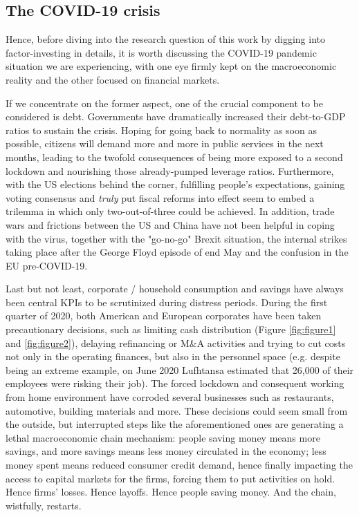 \documentclass[12pt]{article}
\begin{document}
\subsection{The COVID-19 crisis}
Hence, before diving into the research question of this work by digging into factor-investing in details, it is worth discussing the  COVID-19 pandemic situation we are experiencing, with one eye firmly kept on the macroeconomic reality and the other focused on financial markets. 

If we concentrate on the former aspect, one of the crucial component to be considered is debt. Governments have dramatically increased their debt-to-GDP ratios to sustain the crisis. Hoping for going back to normality as soon as possible, citizens will demand more and more in public services in the next months, leading to the twofold consequences of being more exposed to a second lockdown and nourishing those already-pumped leverage ratios. Furthermore, with the US elections behind the corner, fulfilling people's expectations, gaining voting consensus and \textit{truly} put fiscal reforms into effect seem to embed a trilemma in which only two-out-of-three could be achieved. In addition, trade wars and frictions between the US and China have not been helpful in coping with the virus, together with the "go-no-go" Brexit situation, the  internal strikes taking place after the George Floyd episode of end May and the confusion in the EU pre-COVID-19. 

Last but not least, corporate / household consumption and savings have always been central KPIs to be scrutinized during distress periods. During the first quarter of 2020, both American and European corporates have been taken precautionary decisions, such as limiting cash distribution (Figure \ref{fig:figure1} and \ref{fig:figure2}), delaying refinancing or M\&A activities and trying to cut costs not only in the operating finances, but also in the personnel space (e.g. despite being an extreme example, on June 2020 Lufhtansa estimated that 26,000 of their employees were risking their job). The forced lockdown and consequent working from home environment have corroded several businesses such as restaurants, automotive, building materials and more. These decisions could seem small from the outside, but interrupted steps like the aforementioned ones are generating a lethal macroeconomic chain mechanism: people saving money means more savings, and more savings means less money circulated in the economy; less money spent means reduced consumer credit demand, hence finally impacting the access to capital markets for the firms, forcing them to put activities on hold. Hence firms' losses. Hence layoffs. Hence people saving money. And the chain, wistfully, restarts. \\
\end{document}

